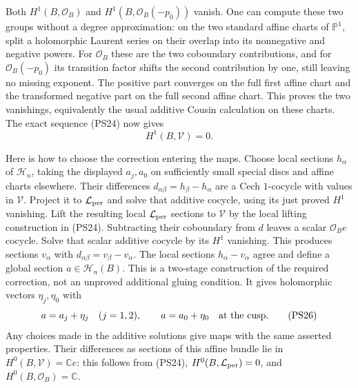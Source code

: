 Both $H^1(B,\mathcal O_B)$ and
$H^1(B,\mathcal O_B(-p_0))$ vanish. One can compute these two
groups without a degree approximation: on the two standard affine
charts of $\mathbb P^1$, split a holomorphic Laurent series on
their overlap into its nonnegative and negative powers. For
$\mathcal O_B$ these are the two coboundary contributions, and
for $\mathcal O_B(-p_0)$ its transition factor shifts the second
contribution by one, still leaving no missing exponent. The positive
part converges on the full first affine chart and the transformed
negative part on the full second affine chart. This proves the two
vanishings, equivalently the usual additive Cousin calculation on
these charts. The exact sequence (PS24) now gives
\[
                             H^1(B,\mathcal V)=0.
 \tag{PS25}\label{pshift:eq:no-analytic-obstruction}
\]

Here is how to choose the correction entering the maps. Choose
local sections $h_\alpha$ of $\mathscr H_n$, taking the displayed
$a_j,a_0$ on sufficiently small special discs and affine charts
elsewhere. Their differences $d_{\alpha\beta}=h_\beta-h_\alpha$
are a Cech $1$-cocycle with values in $\mathcal V$. Project it to
$\mathcal L_{\rm per}$ and solve that additive cocycle, using its just proved
$H^1$ vanishing. Lift the resulting local $\mathcal L_{\rm per}$ sections to
$\mathcal V$ by the local lifting construction in (PS24). Subtracting
their coboundary from $d$ leaves a scalar $\mathcal O_Be$ cocycle.
Solve that scalar additive cocycle by its $H^1$ vanishing. This
produces sections $v_\alpha$ with
$d_{\alpha\beta}=v_\beta-v_\alpha$. The local sections
$h_\alpha-v_\alpha$ agree and define a global section
$a\in\mathscr H_n(B)$. This is a two-stage construction of the
required correction, not an unproved additional gluing condition.
It gives holomorphic vectors $\eta_j,\eta_0$ with
\[
 a=a_j+\eta_j\quad(j=1,2),\qquad a=a_0+\eta_0
                              \quad\hbox{at the cusp}.
 \tag{PS26}\label{pshift:eq:global-correction}
\]
Any choices made in the additive solutions give maps with the same
asserted properties. Their differences as sections of this affine
bundle lie in $H^0(B,\mathcal V)=\mathbb C e$: this follows from
(PS24), $H^0(B,\mathcal L_{\rm per})=0$, and $H^0(B,\mathcal O_B)=\mathbb C$.


